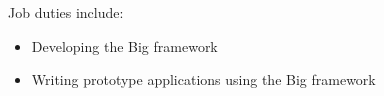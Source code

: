 \normalsize
Job duties include:
\small
\begin{itemize}
    \item Developing the Big framework
    \item Writing prototype applications using the Big framework
\end{itemize}
\normalsize
\medskip
